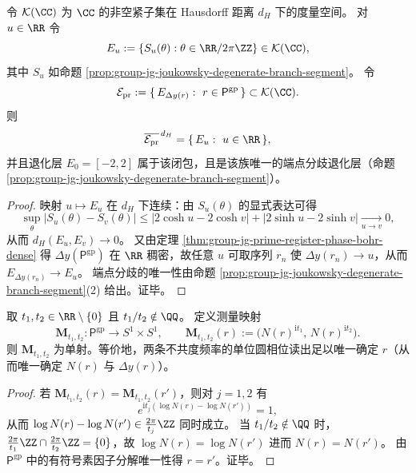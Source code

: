 \begin{theorem}[素数寄存器诱导的椭圆族在紧集空间中的闭包]\label{thm:group-jg-prime-register-ellipse-closure}
令 \(\mathcal K(\CC)\) 为 \(\CC\) 的非空紧子集在 Hausdorff 距离 \(d_H\) 下的度量空间。
对 \(u\in\RR\) 令
\[
E_u:=\{S_u(\theta):\theta\in\RR/2\pi\ZZ\}\in\mathcal K(\CC),
\]
其中 \(S_u\) 如命题 \ref{prop:group-jg-joukowsky-degenerate-branch-segment}。
令
\[
\mathcal E_{\mathrm{pr}}:=\{\,E_{\Delta y(r)}:\ r\in \mathsf{P}^{\mathrm{gp}}\,\}\subset \mathcal K(\CC).
\]
则
\[
\overline{\mathcal E_{\mathrm{pr}}}^{\,d_H}=\{\,E_u:\ u\in\RR\,\},
\]
并且退化层 \(E_0=[-2,2]\) 属于该闭包，且是该族唯一的端点分歧退化层（命题 \ref{prop:group-jg-joukowsky-degenerate-branch-segment}）。
\end{theorem}
\begin{proof}
映射 \(u\mapsto E_u\) 在 \(d_H\) 下连续：由 \(S_u(\theta)\) 的显式表达可得
\[
\sup_{\theta}|S_u(\theta)-S_v(\theta)|
\le |2\cosh u-2\cosh v|+|2\sinh u-2\sinh v|
\xrightarrow[u\to v]{}0,
\]
从而 \(d_H(E_u,E_v)\to 0\)。
又由定理 \ref{thm:group-jg-prime-register-phase-bohr-dense} 得 \(\Delta y(\mathsf{P}^{\mathrm{gp}})\) 在 \(\RR\) 稠密，故任意 \(u\) 可取序列 \(r_n\) 使 \(\Delta y(r_n)\to u\)，从而 \(E_{\Delta y(r_n)}\to E_u\)。
端点分歧的唯一性由命题 \ref{prop:group-jg-joukowsky-degenerate-branch-segment}(2) 给出。证毕。
\end{proof}

\begin{theorem}[两频单位圆相位读出对寄存器态的单射性]\label{thm:group-jg-twofrequency-circle-readout-injective}
取 \(t_1,t_2\in\RR\setminus\{0\}\) 且 \(t_1/t_2\notin\QQ\)。
定义测量映射
\[
\mathbf M_{t_1,t_2}:\mathsf{P}^{\mathrm{gp}}\to S^1\times S^1,\qquad
\mathbf M_{t_1,t_2}(r):=\bigl(N(r)^{\mathrm{i}t_1},\,N(r)^{\mathrm{i}t_2}\bigr).
\]
则 \(\mathbf M_{t_1,t_2}\) 为单射。等价地，两条不共度频率的单位圆相位读出足以唯一确定 \(r\)（从而唯一确定 \(N(r)\) 与 \(\Delta y(r)\)）。
\end{theorem}
\begin{proof}
若 \(\mathbf M_{t_1,t_2}(r)=\mathbf M_{t_1,t_2}(r')\)，则对 \(j=1,2\) 有
\[
e^{\mathrm{i}t_j(\log N(r)-\log N(r'))}=1,
\]
从而 \(\log N(r)-\log N(r')\in \tfrac{2\pi}{t_j}\ZZ\) 同时成立。
当 \(t_1/t_2\notin\QQ\) 时，
\(
\tfrac{2\pi}{t_1}\ZZ\cap\tfrac{2\pi}{t_2}\ZZ=\{0\}
\)，故 \(\log N(r)=\log N(r')\) 进而 \(N(r)=N(r')\)。
由 \(\mathsf{P}^{\mathrm{gp}}\) 中的有符号素因子分解唯一性得 \(r=r'\)。证毕。
\end{proof}


